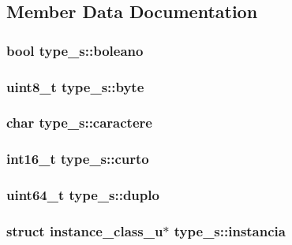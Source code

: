 \subsection{Member Data Documentation}
\hypertarget{uniontype__s_a241f8a42a562eb89ec706b49fdc57fa4}{
\subsubsection[{boleano}]{\setlength{\rightskip}{0pt plus 5cm}bool type\+\_\+s\+::boleano}}\label{uniontype__s_a241f8a42a562eb89ec706b49fdc57fa4}
\hypertarget{uniontype__s_ae617ad116eb257d0e29ba494417a5211}{
\subsubsection[{byte}]{\setlength{\rightskip}{0pt plus 5cm}uint8\+\_\+t type\+\_\+s\+::byte}}\label{uniontype__s_ae617ad116eb257d0e29ba494417a5211}
\hypertarget{uniontype__s_aeb26be2a0a0b2e29de7a74e72bb8e492}{
\subsubsection[{caractere}]{\setlength{\rightskip}{0pt plus 5cm}char type\+\_\+s\+::caractere}}\label{uniontype__s_aeb26be2a0a0b2e29de7a74e72bb8e492}
\hypertarget{uniontype__s_a196bd0937bc2417894575a9102fae072}{
\subsubsection[{curto}]{\setlength{\rightskip}{0pt plus 5cm}int16\+\_\+t type\+\_\+s\+::curto}}\label{uniontype__s_a196bd0937bc2417894575a9102fae072}
\hypertarget{uniontype__s_aaed010195aac62a0d280a663c9bb8ab4}{
\subsubsection[{duplo}]{\setlength{\rightskip}{0pt plus 5cm}uint64\+\_\+t type\+\_\+s\+::duplo}}\label{uniontype__s_aaed010195aac62a0d280a663c9bb8ab4}
\hypertarget{uniontype__s_ad3996647e9adaa3f5e6b827f5112ae48}{
\subsubsection[{instancia}]{\setlength{\rightskip}{0pt plus 5cm}struct {\bf instance\+\_\+class\+\_\+u}$\ast$ type\+\_\+s\+::instancia}}\label{uniontype__s_ad3996647e9adaa3f5e6b827f5112ae48}
